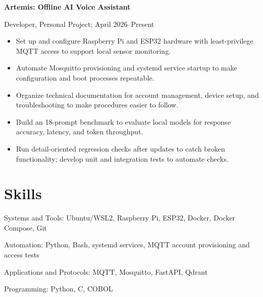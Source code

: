 \documentclass[11pt]{article}
\begin{document}
\textbf{Artemis: Offline AI Voice Assistant}\par
Developer, Personal Project; April 2026--Present
\begin{itemize}
    \item Set up and configure Raspberry Pi and ESP32 hardware with least-privilege MQTT access to support local sensor monitoring.
    \item Automate Mosquitto provisioning and systemd service startup to make configuration and boot processes repeatable.
    \item Organize technical documentation for account management, device setup, and troubleshooting to make procedures easier to follow.
    \item Build an 18-prompt benchmark to evaluate local models for response accuracy, latency, and token throughput.
    \item Run detail-oriented regression checks after updates to catch broken functionality; develop unit and integration tests to automate checks.
\end{itemize}

\section*{Skills}
Systems and Tools: Ubuntu/WSL2, Raspberry Pi, ESP32, Docker, Docker Compose, Git\par
Automation: Python, Bash, systemd services, MQTT account provisioning and access tests\par
Applications and Protocols: MQTT, Mosquitto, FastAPI, Qdrant\par
Programming: Python, C, COBOL
\end{document}

